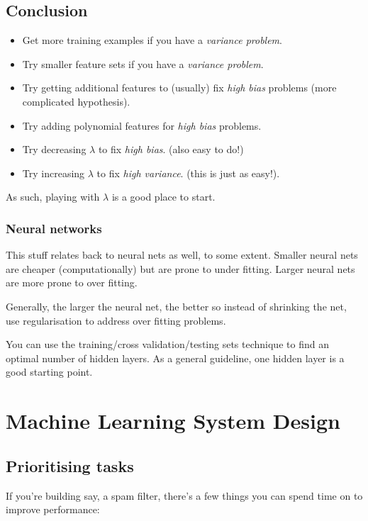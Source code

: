 \section{Conclusion}

\begin{itemize}
\item Get more training examples if you have a \emph{variance problem}.
\item Try smaller feature sets if you have a \emph{variance problem}.
\item Try getting additional features to (usually) fix \emph{high bias} problems (more complicated hypothesis).
\item Try adding polynomial features for \emph{high bias} problems.
\item Try decreasing $\lambda$ to fix \emph{high bias}. (also easy to do!)
\item Try increasing $\lambda$ to fix \emph{high variance}. (this is just as easy!).
\end{itemize}

As such, playing with $\lambda$ is a good place to start.

\subsection{Neural networks}
This stuff relates back to neural nets as well, to some extent. Smaller neural nets are cheaper (computationally) but are prone to under fitting. Larger neural nets are more prone to over fitting. 

Generally, the larger the neural net, the better so instead of shrinking the net, use regularisation to address over fitting problems.

You can use the training/cross validation/testing sets technique to find an optimal number of hidden layers. As a general guideline, one hidden layer is a good starting point.

\chapter{Machine Learning System Design}

\section{Prioritising tasks}

If you're building say, a spam filter, there's a few things you can spend time on to improve performance:

